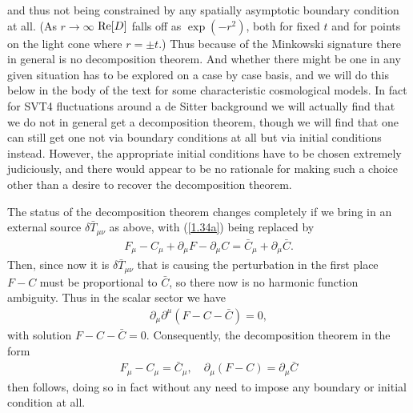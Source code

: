 \documentclass[aps,onecolumn,10pt]{revtex4}
\numberwithin{equation}{section}
\numberwithin{equation}{section}
\begin{document}
%
and thus not being constrained by any spatially asymptotic boundary condition at all. (As $r\rightarrow \infty$
${\rm Re}[D]$ falls off as $\exp(-r^2)$, both for fixed $t$ and for points on the light cone where $r=\pm t$.) Thus because of the Minkowski signature there in general is no decomposition theorem. And whether there might be one in any given situation has to be explored on a case by case basis, and we will do this below in the body of the text for some characteristic cosmological models. In fact for SVT4 fluctuations around a de Sitter background we will actually find that we do not in general get a decomposition theorem, though we will find that one can still get one not via boundary conditions at all but via initial conditions instead. However, the appropriate initial conditions have to be chosen extremely judiciously, and there would appear to be no rationale for making such a choice other than a desire to recover the decomposition theorem.

The status of the decomposition theorem changes completely  if we bring in an external source $\delta \bar{T}_{\mu\nu}$ as above, with (\ref{1.34a}) being replaced by 
%
\begin{eqnarray}
F_{\mu}-C_{\mu}+\partial_{\mu}F-\partial_{\mu}C=\bar{C}_{\mu}+\partial_{\mu}\bar{C}.
\label{1.39a}
\end{eqnarray}
%
Then, since now it is $\delta \bar{T}_{\mu\nu}$ that is causing the perturbation in the first place $F-C$ must be proportional to $\bar{C}$, so there now is no harmonic function ambiguity. Thus in the scalar sector we have
%
\begin{eqnarray}
\partial_{\mu}\partial^{\mu}(F-C-\bar{C})=0, 
\label{1.40a}
\end{eqnarray}
%
with solution $F-C-\bar{C}=0$. Consequently,  the decomposition theorem in the form 
%
\begin{eqnarray}
F_{\mu}-C_{\mu}= \bar{C}_{\mu},\quad \partial_{\mu}(F-C)=\partial_{\mu}\bar{C}
\label{1.41a}
\end{eqnarray}
% 
then follows, doing so in fact without any need to impose any boundary or initial condition at all.
\end{document}
